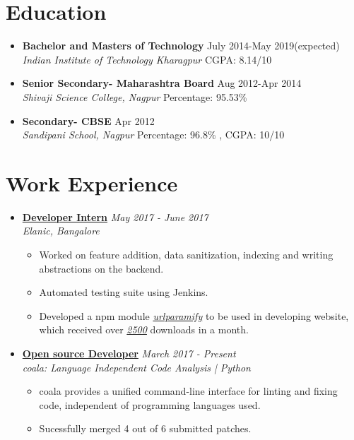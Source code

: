 \documentclass[10pt,a4paper]{moderncv}
\newcommand{\experience}[4]{
  \vspace{0.1cm}
  \item \textbf{\large{#1}} \hfill\textit{#3}\\\textit{#2}
  \begin{itemize}[leftmargin=*]
    \setlength\itemsep{0em} #4
  \end{itemize}
}
\newcommand{\education}[4]{
  \item \textbf{\large{#1}} \hfill #3\\\textit{#2} \hfill #4
}
\begin{document}
\maketitle
\vspace{-1cm}
\section*{Education}
\begin{itemize}
  \setlength\itemsep{1em}

  \education{Bachelor and Masters of Technology}{Indian Institute of Technology Kharagpur}{July 2014-May 2019(expected)}{CGPA: 8.14/10}
  \education{Senior Secondary- Maharashtra Board}{Shivaji Science College, Nagpur}{Aug 2012-Apr 2014}{Percentage: 95.53\%}
  \education{Secondary- CBSE}{Sandipani School, Nagpur}{Apr 2012}{Percentage: 96.8\% , CGPA: 10/10}
\end{itemize}

\section*{Work Experience}
\begin{itemize}
  \setlength\itemsep{0.5em}

  \experience{\href{https://drive.google.com/open?id=0B5iU6cWw36rOVWZIcllPY3RSd2c}{Developer Intern}}{Elanic, Bangalore}{May 2017 - June 2017}{
  	\item	Worked on feature addition, data sanitization, indexing and writing abstractions on the backend.
  	\item Automated testing suite using Jenkins.
  	\item Developed a npm module \href{https://www.npmjs.com/package/urlparamify}{\textit{urlparamify}} to be used in developing website, which received over \href{https://drive.google.com/open?id=0B5iU6cWw36rOd09Bc3ZNV1p4UTQ}{\textit{2500}} downloads in a month.
  }
    
  \experience{\href{https://github.com/orgs/coala/teams/coala-developers/members}{Open source Developer}}{coala: Language Independent Code Analysis | Python}{March 2017 - Present}{
  	\item coala provides a unified command-line interface for linting and fixing code, independent of programming languages used.
  	\item Sucessfully merged 4 out of 6 submitted patches. 
  }

\end{itemize}
\end{document}
